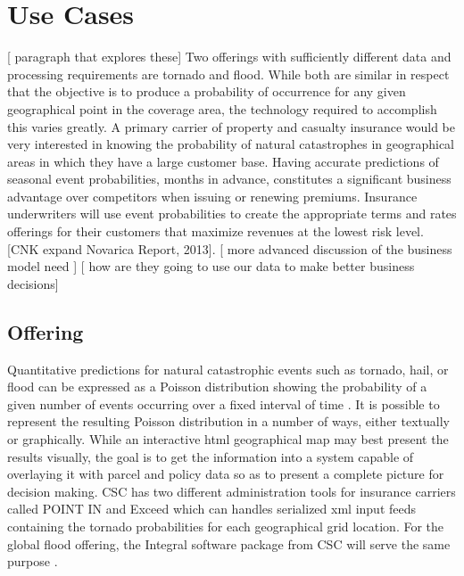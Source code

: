
\section{Use Cases}
[ paragraph that explores these]
Two offerings with sufficiently different data and processing requirements are tornado and flood. While both are similar in  respect that the objective is to produce a probability of occurrence for any given geographical point in the coverage area, the technology required to accomplish this varies greatly. A primary carrier of property and casualty insurance would be very interested in knowing the probability of natural catastrophes in geographical areas in which they have a large customer base. Having accurate predictions of seasonal event probabilities, months in advance, constitutes a significant business advantage over competitors when issuing or renewing premiums. Insurance underwriters will use event probabilities to create the appropriate terms and rates offerings for their customers that maximize revenues at the lowest risk level. [CNK expand Novarica Report, 2013]. [ more advanced discussion of the business model need ]
    [ how are they going to use our data to make better business decisions] \\
\subsection{Offering}
Quantitative predictions for natural catastrophic events such as tornado, hail, or flood can be expressed as a Poisson distribution showing the probability of a given number of events occurring over a fixed interval of time \cite{anderson}. It is possible to represent the resulting Poisson distribution in a number of ways, either textually or graphically. While an interactive \gls{html} geographical map may best present the results visually, the goal is to get the information into a system capable of overlaying it with parcel and policy data so as to present a complete picture for decision making. \textsc{CSC} has two different administration tools for insurance carriers called POINT IN \cite{point_in} and Exceed \cite{exceed} which can handles serialized \gls{xml} input feeds containing the tornado probabilities for each geographical grid location. For the global flood offering, the Integral software package from \textsc{CSC} will serve the same purpose \cite{integral}.

